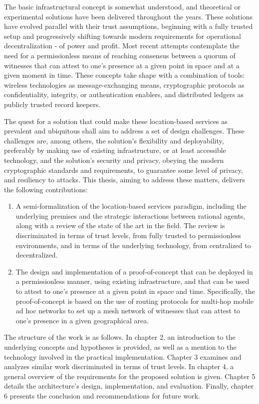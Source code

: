 The basic infrastructural concept is somewhat understood, and theoretical or experimental solutions have been delivered throughout the years. These solutions have evolved parallel with their trust assumptions, beginning with a fully trusted setup and progressively shifting towards modern requirements for operational decentralization - of power and profit. Most recent attempts contemplate the need for a permissionless means of reaching consensus between a quorum of witnesses that can attest to one's presence at a given point in space and at a given moment in time. These concepts take shape with a combination of tools: wireless technologies as message-exchanging means, cryptographic protocols as confidentiality, integrity, or authentication enablers, and distributed ledgers as publicly trusted record keepers. 

The quest for a solution that could make these location-based services as prevalent and ubiquitous shall aim to address a set of design challenges. These challenges are, among others, the solution's flexibility and deployability, preferably by making use of existing infrastructure, or at least accessible technology, and the solution's security and privacy, obeying the modern cryptographic standards and requirements, to guarantee some level of privacy, and resiliency to attacks. This thesis, aiming to address these matters, delivers the following contributions:
\begin{enumerate}
\item A semi-formalization of the location-based services paradigm, including the underlying premises and the strategic interactions between rational agents, along with a review of the state of the art in the field. The review is discriminated in terms of trust levels, from fully trusted to permissionless environments, and in terms of the underlying technology, from centralized to decentralized.
\item The design and implementation of a proof-of-concept that can be deployed in a permissionless manner, using existing infrastructure, and that can be used to attest to one's presence at a given point in space and time. Specifically, the proof-of-concept is based on the use of routing protocols for multi-hop mobile ad hoc networks to set up a mesh network of witnesses that can attest to one's presence in a given geographical area.
\end{enumerate}

The structure of the work is as follows. In chapter 2, an introduction to the underlying concepts and hypotheses is provided, as well as a mention to the technology involved in the practical implementation. Chapter 3 examines and analyzes similar work discriminated in terms of trust levels. In chapter 4, a general overview of the requirements for the proposed solution is given. Chapter 5 details the architecture's design, implementation, and evaluation. Finally, chapter 6 presents the conclusion and recommendations for future work.
